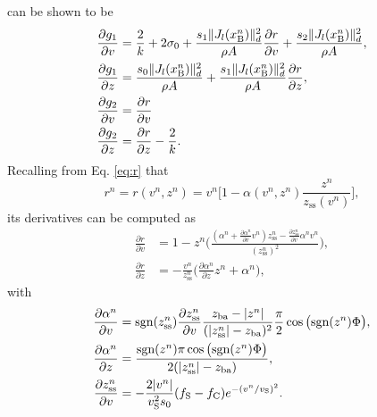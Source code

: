 can be shown to be
\begin{align*}
    \frac{\partial g_1}{\partial v} &= \frac{2}{k} + 2\sigma_0 + \frac{s_1\lVert J_l(x_{\text{B}}^n)\rVert_d^2}{\rho A}\frac{\partial r}{\partial v}+\frac{s_2\lVert J_l(x_{\text{B}}^n)\rVert_d^2}{\rho A},\\
    \frac{\partial g_1}{\partial z} &= \frac{s_0\lVert J_l(x_{\text{B}}^n)\rVert_d^2}{\rho A} + \frac{s_1\lVert J_l(x_{\text{B}}^n)\rVert_d^2}{\rho A}\frac{\partial r}{\partial z},\\
    \frac{\partial g_2}{\partial v} &= \frac{\partial r}{\partial v}
    \\\frac{\partial g_2}{\partial z}&= \frac{\partial r}{\partial z} -\frac{2}{k}.
\end{align*}
Recalling from Eq. \eqref{eq:r} that
\begin{equation*}
    r^n = r(v^n,z^n) = v^n\bigg[1-\alpha(v^n,z^n)\frac{z^n}{z_\text{ss}(v^n)}\bigg],
\end{equation*}
its derivatives can be computed as
\begin{align*}
    \frac{\partial r}{\partial v} &= 1-z^n\Bigg(\frac{(\alpha^n+\frac{\partial \alpha^n}{\partial v}v^n)z_\text{ss}^n - \frac{\partial z_\text{ss}^n}{\partial v}\alpha^n v^n}{(z_\text{ss}^n)^2}\Bigg),\\
    \frac{\partial r}{\partial z} &= -\frac{v^n}{z_\text{ss}^n}\bigg(\frac{\partial \alpha^n}{\partial z}z^n + \alpha^n\bigg),
    \end{align*}
with
\begin{align*}
    \frac{\partial\alpha^n}{\partial v} &=\text{sgn}(z_\text{ss}^n)\frac{\partial z_\text{ss}^n}{\partial v}\frac{z_\text{ba} - |z^n|}{(|z_\text{ss}^n| - z_\text{ba})^2}\frac{\pi}{2}\cos\big(\text{sgn}(z^n)\Phi\big),\\
    \frac{\partial\alpha^n}{\partial z}&=\frac{\text{sgn}(z^n)\pi\cos\big(\text{sgn}(z^n)\Phi\big)}{2(|z_\text{ss}^n|-z_\text{ba})},\\
    \frac{\partial z_\text{ss}^n}{\partial v} &= -\frac{2|v^n|}{v_\text{S}^2 s_0}(f_\text{S}-f_\text{C})e^{-(v^n/v_\text{S})^2}.
\end{align*}
